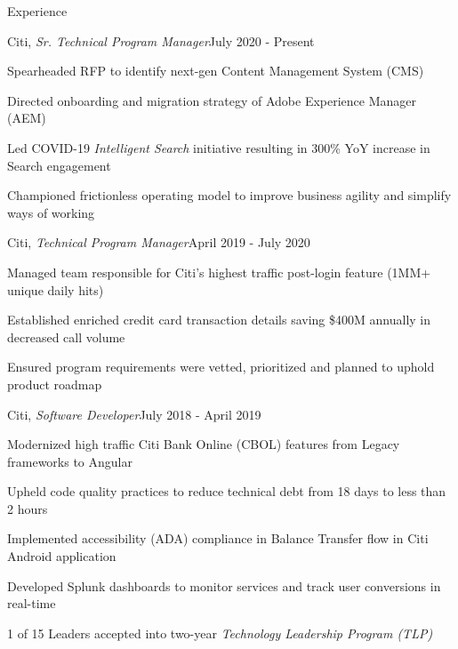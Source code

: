 \documentclass{resume} %
\begin{document}
\begin{rSection}{Experience}

\begin{rSubsection}{Citi, \textit{Sr. Technical Program Manager}}{July 2020 - Present}{}{}
\setlength{\itemindent}{.25in}
\item Spearheaded RFP to identify next-gen Content Management System (CMS)
\item Directed onboarding and migration strategy of Adobe Experience Manager (AEM)
\item Led COVID-19 \textit{Intelligent Search} initiative resulting in 300\% YoY increase in Search engagement
\item Championed frictionless operating model to improve business agility and simplify ways of working
\end{rSubsection}

\begin{rSubsection}{Citi, \textit{Technical Program Manager}}{April 2019 - July 2020}{}{}
\setlength{\itemindent}{.25in}
\item Managed team responsible for Citi's highest traffic post-login feature (1MM+ unique daily hits)
\item Established enriched credit card transaction details saving \$400M annually in decreased call volume
\item Ensured program requirements were vetted, prioritized and planned to uphold product roadmap
\end{rSubsection}

\begin{rSubsection}{Citi, \textit{Software Developer}}{July 2018 - April 2019}{}{}
\setlength{\itemindent}{.25in}
\item Modernized high traffic Citi Bank Online (CBOL) features from Legacy frameworks to Angular
\item Upheld code quality practices to reduce technical debt from 18 days to less than 2 hours
\item Implemented accessibility (ADA) compliance in Balance Transfer flow in Citi Android application
\item Developed Splunk dashboards to monitor services and track user conversions in real-time
\item 1 of 15 Leaders accepted into two-year \textit{Technology Leadership Program (TLP)}
\end{rSubsection}


\end{rSection}
\end{document}
